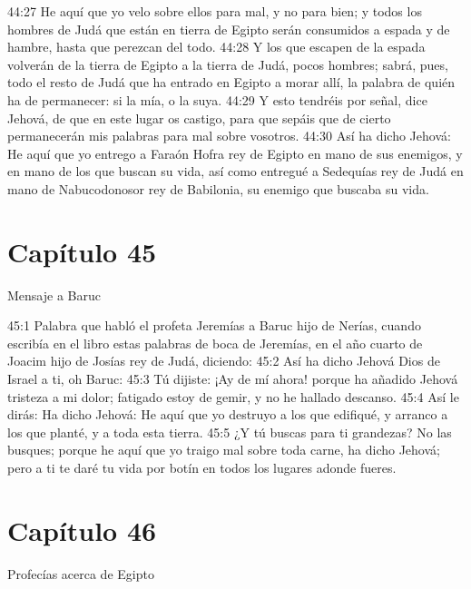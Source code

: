 44:27 He aquí que yo velo sobre ellos para mal, y no para bien; y todos los hombres de Judá que están en tierra de Egipto serán consumidos a espada y de hambre, hasta que perezcan del todo. 
44:28 Y los que escapen de la espada volverán de la tierra de Egipto a la tierra de Judá, pocos hombres; sabrá, pues, todo el resto de Judá que ha entrado en Egipto a morar allí, la palabra de quién ha de permanecer: si la mía, o la suya. 
44:29 Y esto tendréis por señal, dice Jehová, de que en este lugar os castigo, para que sepáis que de cierto permanecerán mis palabras para mal sobre vosotros. 
44:30 Así ha dicho Jehová: He aquí que yo entrego a Faraón Hofra rey de Egipto en mano de sus enemigos, y en mano de los que buscan su vida, así como entregué a Sedequías rey de Judá en mano de Nabucodonosor rey de Babilonia, su enemigo que buscaba su vida. 
\section*{Capítulo 45 }
Mensaje a Baruc 
 
45:1 Palabra que habló el profeta Jeremías a Baruc hijo de Nerías, cuando escribía en el libro estas palabras de boca de Jeremías, en el año cuarto de Joacim hijo de Josías rey de Judá, diciendo: 
45:2 Así ha dicho Jehová Dios de Israel a ti, oh Baruc: 
45:3 Tú dijiste: ¡Ay de mí ahora! porque ha añadido Jehová tristeza a mi dolor; fatigado estoy de gemir, y no he hallado descanso. 
45:4 Así le dirás: Ha dicho Jehová: He aquí que yo destruyo a los que edifiqué, y arranco a los que planté, y a toda esta tierra. 
45:5 ¿Y tú buscas para ti grandezas? No las busques; porque he aquí que yo traigo mal sobre toda carne, ha dicho Jehová; pero a ti te daré tu vida por botín en todos los lugares adonde fueres. 
\section*{Capítulo 46 }
Profecías acerca de Egipto 
 
